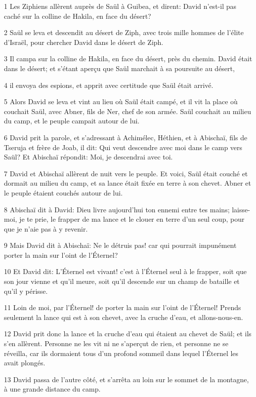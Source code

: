 \par 1 Les Ziphiens allèrent auprès de Saül à Guibea, et dirent: David n'est-il pas caché sur la colline de Hakila, en face du désert?
\par 2 Saül se leva et descendit au désert de Ziph, avec trois mille hommes de l'élite d'Israël, pour chercher David dans le désert de Ziph.
\par 3 Il campa sur la colline de Hakila, en face du désert, près du chemin. David était dans le désert; et s'étant aperçu que Saül marchait à sa poursuite au désert,
\par 4 il envoya des espions, et apprit avec certitude que Saül était arrivé.
\par 5 Alors David se leva et vint au lieu où Saül était campé, et il vit la place où couchait Saül, avec Abner, fils de Ner, chef de son armée. Saül couchait au milieu du camp, et le peuple campait autour de lui.
\par 6 David prit la parole, et s'adressant à Achimélec, Héthien, et à Abischaï, fils de Tseruja et frère de Joab, il dit: Qui veut descendre avec moi dans le camp vers Saül? Et Abischaï répondit: Moi, je descendrai avec toi.
\par 7 David et Abischaï allèrent de nuit vers le peuple. Et voici, Saül était couché et dormait au milieu du camp, et sa lance était fixée en terre à son chevet. Abner et le peuple étaient couchés autour de lui.
\par 8 Abischaï dit à David: Dieu livre aujourd'hui ton ennemi entre tes mains; laisse-moi, je te prie, le frapper de ma lance et le clouer en terre d'un seul coup, pour que je n'aie pas à y revenir.
\par 9 Mais David dit à Abischaï: Ne le détruis pas! car qui pourrait impunément porter la main sur l'oint de l'Éternel?
\par 10 Et David dit: L'Éternel est vivant! c'est à l'Éternel seul à le frapper, soit que son jour vienne et qu'il meure, soit qu'il descende sur un champ de bataille et qu'il y périsse.
\par 11 Loin de moi, par l'Éternel! de porter la main sur l'oint de l'Éternel! Prends seulement la lance qui est à son chevet, avec la cruche d'eau, et allons-nous-en.
\par 12 David prit donc la lance et la cruche d'eau qui étaient au chevet de Saül; et ils s'en allèrent. Personne ne les vit ni ne s'aperçut de rien, et personne ne se réveilla, car ils dormaient tous d'un profond sommeil dans lequel l'Éternel les avait plongés.
\par 13 David passa de l'autre côté, et s'arrêta au loin sur le sommet de la montagne, à une grande distance du camp.
